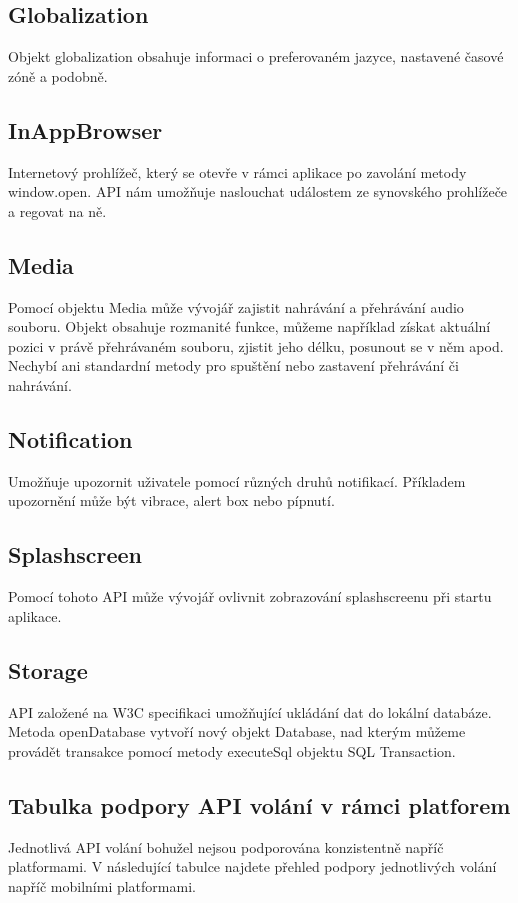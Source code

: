 \subsection{Globalization}
Objekt globalization obsahuje informaci o preferovaném jazyce, nastavené časové zóně a podobně.

\subsection{InAppBrowser}
Internetový prohlížeč, který se otevře v rámci aplikace po zavolání metody window.open. API nám umožňuje naslouchat událostem ze synovského prohlížeče a regovat na ně.

\subsection{Media}
Pomocí objektu Media může vývojář zajistit nahrávání a přehrávání audio souboru. Objekt obsahuje rozmanité funkce, můžeme například získat aktuální pozici v právě přehrávaném souboru, zjistit jeho délku, posunout se v něm apod. Nechybí ani standardní metody pro spuštění nebo zastavení přehrávání či nahrávání.

\subsection{Notification}
Umožňuje upozornit uživatele pomocí různých druhů notifikací. Příkladem upozornění může být vibrace, alert box nebo pípnutí.

\subsection{Splashscreen}
Pomocí tohoto API může vývojář ovlivnit zobrazování splashscreenu při startu aplikace.

\subsection{Storage}
API založené na W3C specifikaci umožňující ukládání dat do lokální databáze. Metoda openDatabase vytvoří nový objekt Database, nad kterým můžeme provádět transakce pomocí metody executeSql objektu SQL Transaction.

\subsection{Tabulka podpory API volání v rámci platforem}
Jednotlivá API volání bohužel nejsou podporována konzistentně napříč platformami. V následující tabulce najdete přehled podpory jednotlivých volání napříč mobilními platformami.

